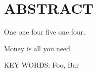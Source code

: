 \chapter*{\bfseries ABSTRACT}
\noindent

One one four five one four.

Money is all you need.

\bigskip
\bigskip

KEY WORDS: Foo, Bar